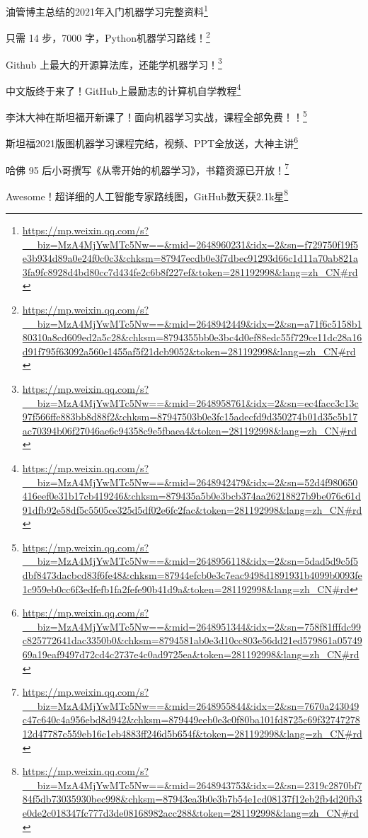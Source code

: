 \documentclass[]{ctexbook}
\renewcommand{\href}[2]{#2\footnote{\url{#1}}}
\begin{document}
\href{https://mp.weixin.qq.com/s?__biz=MzA4MjYwMTc5Nw==\&mid=2648960231\&idx=2\&sn=f729750f19f5e3b934d89a0e24f0c0c3\&chksm=87947ecdb0e3f7dbec91293d66c1d11a70ab821a3fa9fc8928d4bd80cc7d434fe2c6b8f227ef\&token=281192998\&lang=zh_CN\#rd}{油管博主总结的2021年入门机器学习完整资料}

\href{https://mp.weixin.qq.com/s?__biz=MzA4MjYwMTc5Nw==\&mid=2648942449\&idx=2\&sn=a71f6c5158b180310a8cd609ed2a5c28\&chksm=8794355bb0e3bc4d0ef88edc55f729ce11dc28a16d91f795f63092a560e1455af5f21dcb9052\&token=281192998\&lang=zh_CN\#rd}{只需 14 步，7000 字，Python机器学习路线！}

\href{https://mp.weixin.qq.com/s?__biz=MzA4MjYwMTc5Nw==\&mid=2648958761\&idx=2\&sn=ec4facc3c13c97f566ffe883bb8d88f2\&chksm=87947503b0e3fc15adecfd9d350274b01d35c5b17ac70394b06f27046ae6c94358c9e5fbaea4\&token=281192998\&lang=zh_CN\#rd}{Github 上最大的开源算法库，还能学机器学习！}

\href{https://mp.weixin.qq.com/s?__biz=MzA4MjYwMTc5Nw==\&mid=2648942479\&idx=2\&sn=52d4f980650416eef0e31b17cb419246\&chksm=879435a5b0e3bcb374aa26218827b9be076c61d91dfb92e58df5c5505ce325d5df02e6fc2fac\&token=281192998\&lang=zh_CN\#rd}{中文版终于来了！GitHub上最励志的计算机自学教程}

\href{https://mp.weixin.qq.com/s?__biz=MzA4MjYwMTc5Nw==\&mid=2648956118\&idx=2\&sn=5dad5d9c5f5dbf8473dacbcd83f6fe48\&chksm=87944efcb0e3c7eac9498d1891931b4099b0093fe1c959eb0cc6f3edfefb1fa2fefe90b41d9a\&token=281192998\&lang=zh_CN\#rd}{李沐大神在斯坦福开新课了！面向机器学习实战，课程全部免费！！}

\href{https://mp.weixin.qq.com/s?__biz=MzA4MjYwMTc5Nw==\&mid=2648951344\&idx=2\&sn=758f81fffdc99c825772641dac3350b0\&chksm=8794581ab0e3d10cc803e56dd21ed579861a0574969a19eaf9497d72cd4c2737e4c0ad9725ea\&token=281192998\&lang=zh_CN\#rd}{斯坦福2021版图机器学习课程完结，视频、PPT全放送，大神主讲}

\href{https://mp.weixin.qq.com/s?__biz=MzA4MjYwMTc5Nw==\&mid=2648955844\&idx=2\&sn=7670a243049c47c640c4a956ebd8d942\&chksm=879449eeb0e3c0f80ba101fd8725c69f3274727812d47787c559eb16c1eb4883ff246d5b654f\&token=281192998\&lang=zh_CN\#rd}{哈佛 95 后小哥撰写《从零开始的机器学习》，书籍资源已开放！}

\href{https://mp.weixin.qq.com/s?__biz=MzA4MjYwMTc5Nw==\&mid=2648943753\&idx=2\&sn=2319c2870bf784f5db73035930bec998\&chksm=87943ea3b0e3b7b54e1cd08137f12eb2fb4d20fb3e0de2c018347fc777d3de08168982acc288\&token=281192998\&lang=zh_CN\#rd}{Awesome！超详细的人工智能专家路线图，GitHub数天获2.1k星}
\end{document}
